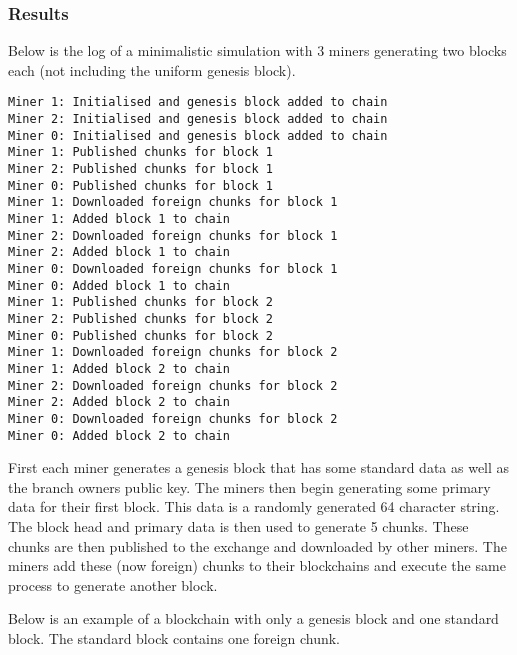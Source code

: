 \documentclass[]{article}
\begin{document}
\hypertarget{header-n109}{%
\subsubsection{Results}\label{header-n109}}

Below is the log of a minimalistic simulation with 3 miners generating
two blocks each (not including the uniform genesis block).

\begin{verbatim}
Miner 1: Initialised and genesis block added to chain
Miner 2: Initialised and genesis block added to chain
Miner 0: Initialised and genesis block added to chain
Miner 1: Published chunks for block 1
Miner 2: Published chunks for block 1
Miner 0: Published chunks for block 1
Miner 1: Downloaded foreign chunks for block 1
Miner 1: Added block 1 to chain
Miner 2: Downloaded foreign chunks for block 1
Miner 2: Added block 1 to chain
Miner 0: Downloaded foreign chunks for block 1
Miner 0: Added block 1 to chain
Miner 1: Published chunks for block 2
Miner 2: Published chunks for block 2
Miner 0: Published chunks for block 2
Miner 1: Downloaded foreign chunks for block 2
Miner 1: Added block 2 to chain
Miner 2: Downloaded foreign chunks for block 2
Miner 2: Added block 2 to chain
Miner 0: Downloaded foreign chunks for block 2
Miner 0: Added block 2 to chain
\end{verbatim}

First each miner generates a genesis block that has some standard data
as well as the branch owners public key. The miners then begin
generating some primary data for their first block. This data is a
randomly generated 64 character string. The block head and primary data
is then used to generate 5 chunks. These chunks are then published to
the exchange and downloaded by other miners. The miners add these (now
foreign) chunks to their blockchains and execute the same process to
generate another block.

Below is an example of a blockchain with only a genesis block and one
standard block. The standard block contains one foreign chunk.
\end{document}
